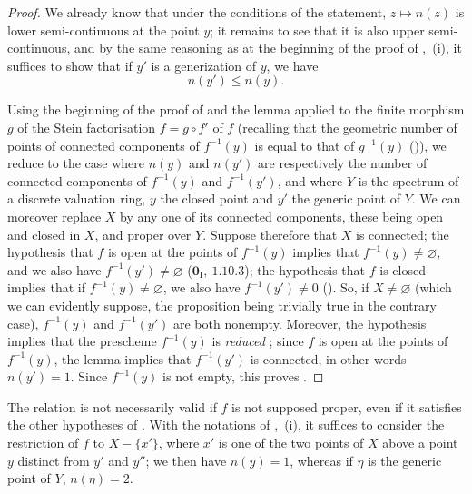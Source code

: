 \begin{proof}
We already know  that under the conditions of the statement, $z\mapsto n(z)$ is lower semi-continuous at the point $y$; it remains to see that it is also upper semi-continuous, and by the same reasoning as at the beginning of the proof of ,~(i), it suffices to show that if $y'$ is a generization of $y$, we have
\begin{equation}
\tag{15.5.7.1}
\label{IV.15.5.7.1}
  n(y') \leq n(y).
\end{equation}

Using the beginning of the proof of  and the lemma  applied to the finite morphism $g$ of the Stein factorisation $f=g\circ f'$ of $f$ (recalling that the geometric number of points of connected components of $f^{-1}(y)$ is equal to that of $g^{-1}(y)$ ()), we reduce to the case where $n(y)$ and $n(y')$ are respectively the number of connected components of $f^{-1}(y)$ and $f^{-1}(y')$, and where $Y$ is the spectrum of a discrete valuation ring, $y$ the closed point and $y'$ the generic point of $Y$.
We can moreover replace $X$ by any one of its connected components, these being open and closed in $X$, and proper over $Y$.
Suppose therefore that $X$ is connected; the hypothesis that $f$ is open at the points of $f^{-1}(y)$ implies that $f^{-1}(y)\neq\varnothing$, and we also have $f^{-1}(y')\neq\varnothing$ ($\mathbf{0}_{\mathrm{I}},~1.10.3$); the hypothesis that $f$ is closed implies that if $f^{-1}(y)\neq\varnothing$, we also have $f^{-1}(y')\neq 0$ ().
So, if $X\neq\varnothing$ (which we can evidently suppose, the proposition being trivially true in the contrary case), $f^{-1}(y)$ and $f^{-1}(y')$ are both nonempty.
Moreover, the hypothesis implies that the prescheme $f^{-1}(y)$ is \emph{reduced} ; since $f$ is open at the points of $f^{-1}(y)$, the lemma  implies that $f^{-1}(y')$ is connected, in other words $n(y')=1$.
Since $f^{-1}(y)$ is not empty, this proves .
\end{proof}

\begin{remarks}[15.5.8]
\label{IV.15.5.8}
The relation  is not necessarily valid if $f$ is not supposed proper, even if it satisfies the other hypotheses of .
With the notations of ,~(i), it suffices to consider the restriction of $f$ to $X-\{x'\}$, where $x'$ is one of the two points of $X$ above a point $y$ distinct from $y'$ and $y''$; we then have $n(y)=1$, whereas if $\eta$ is the generic point of $Y$, $n(\eta)=2$.
\end{remarks}

